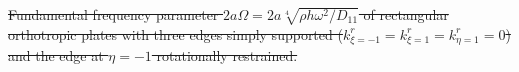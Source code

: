 \documentclass[preprint,12pt,number]{elsarticle}
\providecommand{\DIFdeltex}[1]{{\protect\color{red}\sout{#1}}}                      %
\providecommand{\DIFdelbegin}{} %
\providecommand{\DIFdelFL}[1]{\DIFdel{#1}} %
\providecommand{\DIFdel}[1]{\texorpdfstring{\DIFdeltex{#1}}{}} %
\newcommand{\DIFscaledelfig}{0.5}
\newlength{\DIFdelgraphicswidth} %
\newlength{\DIFdelgraphicsheight} %
\newcommand{\DIFdelincludegraphics}[2][]{%
\sbox{\DIFdelgraphicsbox}{\DIFOincludegraphics[#1]{#2}}%
\settoboxwidth{\DIFdelgraphicswidth}{\DIFdelgraphicsbox} %
\settoboxtotalheight{\DIFdelgraphicsheight}{\DIFdelgraphicsbox} %
\scalebox{\DIFscaledelfig}{%
\parbox[b]{\DIFdelgraphicswidth}{\usebox{\DIFdelgraphicsbox}\\[-\baselineskip] \rule{\DIFdelgraphicswidth}{0em}}\llap{\resizebox{\DIFdelgraphicswidth}{\DIFdelgraphicsheight}{%
\setlength{\unitlength}{\DIFdelgraphicswidth}%
\begin{picture}(1,1)%
\thicklines\linethickness{2pt} %
{\color[rgb]{1,0,0}\put(0,0){\framebox(1,1){}}}%
{\color[rgb]{1,0,0}\put(0,0){\line( 1,1){1}}}%
{\color[rgb]{1,0,0}\put(0,1){\line(1,-1){1}}}%
\end{picture}%
}\hspace*{3pt}}} %
} %
\DeclareRobustCommand{\DIFdelbegin}{\DIFOdelbegin \let\includegraphics\DIFdelincludegraphics} %
\begin{document}
\begin{enumerate}[label=(\roman*)]
	
	\DIFdelbegin %
{%
\DIFdelFL{Fundamental frequency parameter $2a\Omega = 2a\sqrt[4]{\rho h \omega^2/D_{11}}$ of rectangular orthotropic plates with three edges simply supported ($k^r_{\xi=-1} = k^r_{\xi=1} = k^r_{\eta=1} = 0$) and the edge at $\eta = -1$ rotationally restrained.}}

\end{enumerate}
\end{document}
